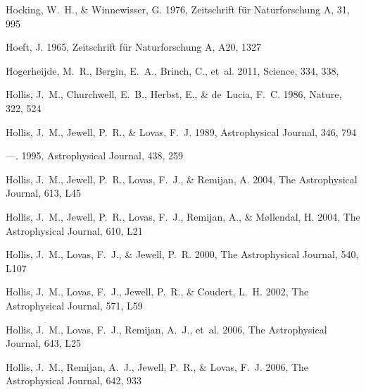 \documentclass[twocolumn]{aastex631}
\begin{document}
\begin{thebibliography}{}
Hocking, W.~H., \& Winnewisser, G. 1976, Zeitschrift f{\"u}r Naturforschung A,
  31, 995

Hoeft, J. 1965, Zeitschrift f{\"u}r Naturforschung A, A20, 1327

{Hogerheijde}, M.~R., {Bergin}, E.~A., {Brinch}, C., {et~al.} 2011, Science,
  334, 338, 

Hollis, J.~M., Churchwell, E.~B., Herbst, E., \& de~Lucia, F.~C. 1986, Nature,
  322, 524

Hollis, J.~M., Jewell, P.~R., \& Lovas, F.~J. 1989, Astrophysical Journal, 346,
  794

---. 1995, Astrophysical Journal, 438, 259

Hollis, J.~M., Jewell, P.~R., Lovas, F.~J., \& Remijan, A. 2004{},
  The Astrophysical Journal, 613, L45

Hollis, J.~M., Jewell, P.~R., Lovas, F.~J., Remijan, A., \& M{\o}llendal, H.
  2004{}, The Astrophysical Journal, 610, L21

Hollis, J.~M., Lovas, F.~J., \& Jewell, P.~R. 2000, The Astrophysical Journal,
  540, L107

Hollis, J.~M., Lovas, F.~J., Jewell, P.~R., \& Coudert, L.~H. 2002, The
  Astrophysical Journal, 571, L59

Hollis, J.~M., Lovas, F.~J., Remijan, A.~J., {et~al.} 2006{}, The
  Astrophysical Journal, 643, L25

Hollis, J.~M., Remijan, A.~J., Jewell, P.~R., \& Lovas, F.~J.
  2006{}, The Astrophysical Journal, 642, 933


\end{thebibliography}
\end{document}

